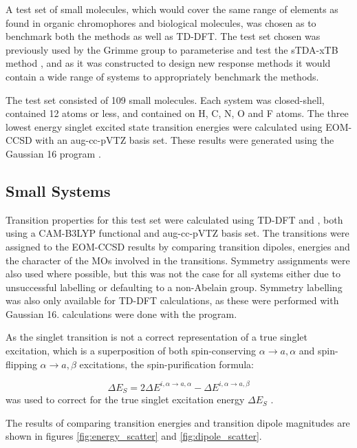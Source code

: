 A test set of small molecules, which would cover the same range of elements
as found in organic chromophores and biological molecules, was chosen as to benchmark 
both the \dscf methods as well as TD-DFT. The test set chosen was previously used
by the Grimme group to parameterise and test the sTDA-xTB method \cite{Grimme2017},
and as it was constructed to design new response methods it would contain a wide 
range of systems to appropriately benchmark the \dscf methods.

The test set consisted of 109 small molecules. Each system was closed-shell, 
contained 12 atoms or less, and contained on H, C, N, O and F atoms. The three lowest
energy singlet excited state transition energies were calculated using EOM-CCSD
with an aug-cc-pVTZ basis set. These results were generated using the Gaussian 16 
program \cite{Gaussian16}.

\subsection{Small Systems}
\label{subsec:smalltest}
Transition properties for this test set were calculated using TD-DFT and \dscf,
both using a CAM-B3LYP functional and aug-cc-pVTZ basis set. The transitions were
assigned to the EOM-CCSD results by comparing transition dipoles, energies and 
the character of the MOs involved in the transitions. Symmetry assignments were
also used where possible, but this was not the case for all systems either due to
unsuccessful labelling or defaulting to a non-Abelain group. Symmetry labelling 
was also only available for TD-DFT calculations, as these were performed with Gaussian
16. \dscf calculations were done with the  program.

As the \dscf singlet transition is not a correct representation of a true singlet
excitation, which is a superposition of both spin-conserving $\alpha \rightarrow a,
\alpha$ and spin-flipping $\alpha \rightarrow a, \beta$ excitations, the spin-purification 
formula:

\begin{equation}
\Delta E_S = 2\Delta E^{i,\alpha \rightarrow a, \alpha} - \Delta E^{i,\alpha \rightarrow a, \beta}
\end{equation}
%
was used to correct for the true singlet excitation energy $\Delta E_S$ \cite{Ziegler1977}.

The results of comparing transition energies and transition dipole magnitudes are
shown in figures \ref{fig:energy_scatter} and \ref{fig:dipole_scatter}.

